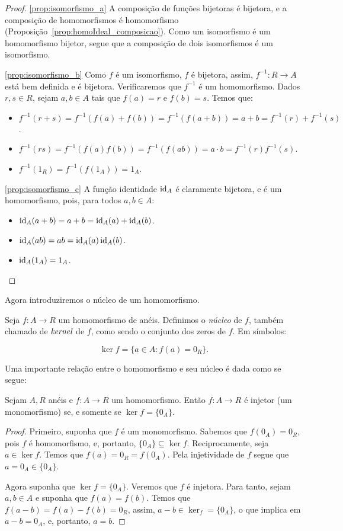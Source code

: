\begin{proof}
\ref{prop:isomorfismo_a} A composição de funções bijetoras é bijetora, e a composição de homomorfismos é homomorfismo (Proposição~\ref{prop:homoIdeal_composicao}).
Como um isomorfismo é um homomorfismo bijetor, segue que a composição de dois isomorfismos é um isomorfismo.

\ref{prop:isomorfismo_b} Como $f$ é um isomorfismo, $f$ é bijetora, assim, $f^{-1}:R\rightarrow A$ está bem definida e é bijetora. Verificaremos que $f^{-1}$ é um homomorfismo. Dados $r, s \in R$, sejam $a, b \in A$ tais que $f(a)=r$ e $f(b)=s$. Temos que:
\begin{itemize}
    \item $f^{-1}(r+s)=f^{-1}(f(a)+f(b))=f^{-1}(f(a+b))=a+b=f^{-1}(r)+f^{-1}(s)$.
    \item $f^{-1}(rs)=f^{-1}(f(a)f(b))=f^{-1}(f(ab))=a\cdot b=f^{-1}(r)f^{-1}(s)$.
    \item $f^{-1}(1_R)=f^{-1}(f(1_A))=1_A$.
\end{itemize}

\ref{prop:isomorfismo_c} A função identidade $\operatorname{id}_A$ é claramente bijetora, e é um homomorfismo, pois, para todos $a, b \in A$:
    \begin{itemize}
        \item $\operatorname{id}_A(a+b)=a+b=\operatorname{id}_A(a)+\operatorname{id}_A(b)$.
        \item $\operatorname{id}_A(ab)=ab=\operatorname{id}_A(a)\operatorname{id}_A(b)$.
        \item $\operatorname{id}_A(1_A)=1_A$.
    \end{itemize}
\end{proof}

Agora introduziremos o núcleo de um homomorfismo.
\begin{definition}
    Seja $f: A\rightarrow R$ um homomorfismo de anéis.
    Definimos o \emph{núcleo} de $f$, também chamado de $\emph{kernel}$ de $f$, como sendo o conjunto dos zeros de $f$.
    Em símbolos:

    \[\ker f=\{a \in A: f(a)=0_R\}.\]
\end{definition}
Uma importante relação entre o homomorfismo e seu núcleo é dada como se segue:

\begin{prop}
Sejam $A, R$ anéis e $f:A\rightarrow R$ um homomorfismo. Então $f:A\rightarrow R$ é injetor (um monomorfismo) se, e somente se $\ker f = \{0_A\}$.
\end{prop}

\begin{proof}
    Primeiro, suponha que $f$ é um monomorfismo.
    Sabemos que $f(0_A)=0_R$, pois $f$ é homomorfismo, e, portanto, $\{0_A\}\subseteq \ker f$.
    Reciprocamente, seja $a \in \ker f$.
    Temos que $f(a)=0_R=f(0_A)$. Pela injetividade de $f$ segue que $a=0_A\in \{0_A\}$.

    Agora suponha que $\ker f=\{0_A\}$.
    Veremos que $f$ é injetora.
    Para tanto, sejam $a, b \in A$ e suponha que $f(a)=f(b)$.
    Temos que $f(a-b)=f(a)-f(b)=0_R$, assim, $a-b\in \ker_f = \{0_A\}$, o que implica em $a-b=0_A$, e, portanto, $a=b$.
\end{proof}
